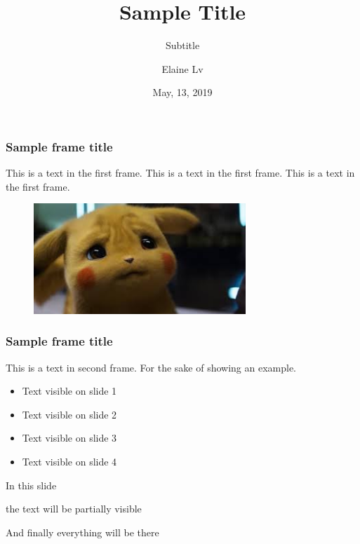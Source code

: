 \documentclass{beamer}%
\title[Short Title] %
{Sample Title}
\subtitle{Subtitle}
\author[Yina Lv] %
{Elaine Lv}
\institute[ECNU] %
{
  Computer Science and Technology\\
  East China Normal University

}
\date[May, 13, 2019] %
{May, 13, 2019}
\begin{document}
\frame{\titlepage}


\begin{frame}
    \frametitle{Sample frame title}
    This is a text in the first frame. This is a text in the first frame. This is a text in the first frame.

    \begin{figure}[h]
      \includegraphics[width=8cm]{pkq}
    \end{figure}

\end{frame}

\begin{frame}
    \frametitle{Sample frame title}
    This is a text in second frame.
    For the sake of showing an example.

    \begin{itemize}
     \item<1-> Text visible on slide 1
     \item<2-> Text visible on slide 2
     \item<3-> Text visible on slide 3
     \item<4-> Text visible on slide 4
    \end{itemize}

\end{frame}

{
    \begin{frame}
     In this slide \pause

     the text will be partially visible \pause

     And finally everything will be there
    \end{frame}
}
\end{document}
